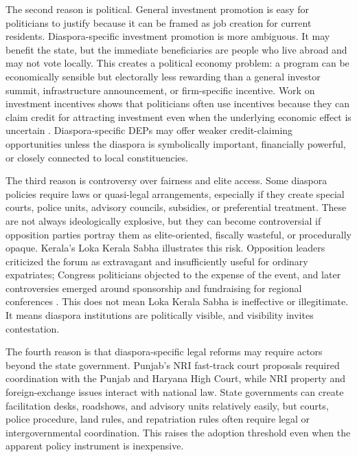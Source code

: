 \documentclass[12pt]{article}
\begin{document}
The second reason is political. General investment promotion is easy for politicians to justify because it can be framed as job creation for current residents. Diaspora-specific investment promotion is more ambiguous. It may benefit the state, but the immediate beneficiaries are people who live abroad and may not vote locally. This creates a political economy problem: a program can be economically sensible but electorally less rewarding than a general investor summit, infrastructure announcement, or firm-specific incentive. Work on investment incentives shows that politicians often use incentives because they can claim credit for attracting investment even when the underlying economic effect is uncertain \citep{jensen_pass_2014, jensen_incentives_2018}. Diaspora-specific DEPs may offer weaker credit-claiming opportunities unless the diaspora is symbolically important, financially powerful, or closely connected to local constituencies.

The third reason is controversy over fairness and elite access. Some diaspora policies require laws or quasi-legal arrangements, especially if they create special courts, police units, advisory councils, subsidies, or preferential treatment. These are not always ideologically explosive, but they can become controversial if opposition parties portray them as elite-oriented, fiscally wasteful, or procedurally opaque. Kerala's Loka Kerala Sabha illustrates this risk. Opposition leaders criticized the forum as extravagant and insufficiently useful for ordinary expatriates; Congress politicians objected to the expense of the event, and later controversies emerged around sponsorship and fundraising for regional conferences \citep{tnn_cut_2022, express_news_services_udf_2023}. This does not mean Loka Kerala Sabha is ineffective or illegitimate. It means diaspora institutions are politically visible, and visibility invites contestation.

The fourth reason is that diaspora-specific legal reforms may require actors beyond the state government. Punjab's NRI fast-track court proposals required coordination with the Punjab and Haryana High Court, while NRI property and foreign-exchange issues interact with national law. State governments can create facilitation desks, roadshows, and advisory units relatively easily, but courts, police procedure, land rules, and repatriation rules often require legal or intergovernmental coordination. This raises the adoption threshold even when the apparent policy instrument is inexpensive.
\end{document}
